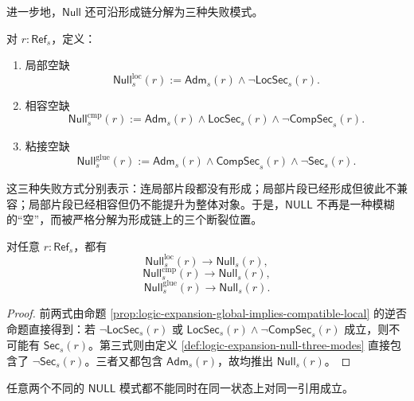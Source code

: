 进一步地，\(\mathsf{Null}\) 还可沿形成链分解为三种失败模式。

\begin{definition}\label{def:logic-expansion-null-three-modes}
对 \(r:\mathsf{Ref}_s\)，定义：
\begin{enumerate}
  \item 局部空缺
  \[
  \mathsf{Null}^{\mathrm{loc}}_s(r)
  :=
  \mathsf{Adm}_s(r)\land \neg \mathsf{LocSec}_s(r).
  \]
  \item 相容空缺
  \[
  \mathsf{Null}^{\mathrm{cmp}}_s(r)
  :=
  \mathsf{Adm}_s(r)\land \mathsf{LocSec}_s(r)\land \neg \mathsf{CompSec}_s(r).
  \]
  \item 粘接空缺
  \[
  \mathsf{Null}^{\mathrm{glue}}_s(r)
  :=
  \mathsf{Adm}_s(r)\land \mathsf{CompSec}_s(r)\land \neg \mathsf{Sec}_s(r).
  \]
\end{enumerate}
\end{definition}

这三种失败方式分别表示：连局部片段都没有形成；局部片段已经形成但彼此不兼容；局部片段已经相容但仍不能提升为整体对象。于是，\(\mathsf{NULL}\) 不再是一种模糊的“空”，而被严格分解为形成链上的三个断裂位置。

\begin{proposition}\label{prop:logic-expansion-null-modes-imply-null}
对任意 \(r:\mathsf{Ref}_s\)，都有
\[
\mathsf{Null}^{\mathrm{loc}}_s(r)\to \mathsf{Null}_s(r),
\]
\[
\mathsf{Null}^{\mathrm{cmp}}_s(r)\to \mathsf{Null}_s(r),
\]
\[
\mathsf{Null}^{\mathrm{glue}}_s(r)\to \mathsf{Null}_s(r).
\]
\end{proposition}

\begin{proof}
前两式由命题 \ref{prop:logic-expansion-global-implies-compatible-local} 的逆否命题直接得到：若 \(\neg \mathsf{LocSec}_s(r)\) 或 \(\mathsf{LocSec}_s(r)\land \neg \mathsf{CompSec}_s(r)\) 成立，则不可能有 \(\mathsf{Sec}_s(r)\)。第三式则由定义 \ref{def:logic-expansion-null-three-modes} 直接包含了 \(\neg \mathsf{Sec}_s(r)\)。三者又都包含 \(\mathsf{Adm}_s(r)\)，故均推出 \(\mathsf{Null}_s(r)\)。
\end{proof}

\begin{proposition}\label{prop:logic-expansion-null-modes-exclusive}
任意两个不同的 \(\mathsf{NULL}\) 模式都不能同时在同一状态上对同一引用成立。
\end{proposition}

